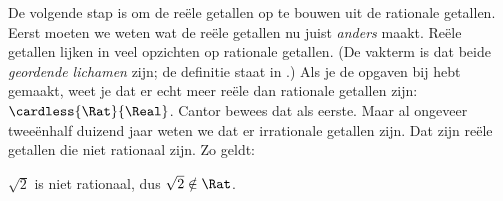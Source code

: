 \documentclass[../../../include/open-logic-section]{subfiles}
\begin{document}
De volgende stap is om de reële getallen op te bouwen uit de rationale
getallen. Eerst moeten we weten wat de reële getallen nu juist
\emph{anders} maakt.
Reële getallen lijken in veel opzichten op rationale getallen. (De
vakterm is dat beide \emph{geordende lichamen} zijn; de definitie staat
in .) Als je de opgaven bij
 hebt gemaakt, weet je dat er echt meer reële
dan rationale getallen zijn: $\cardless{\Rat}{\Real}$. Cantor bewees
dat als eerste. Maar al ongeveer tweeënhalf duizend jaar weten we dat
er irrationale getallen zijn. Dat zijn reële getallen die niet
rationaal zijn. Zo geldt:
\begin{thm}
$\sqrt{2}$ is niet rationaal, dus $\sqrt{2} \notin \Rat$.
\end{thm}
\end{document}
